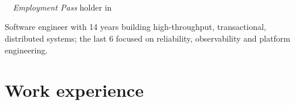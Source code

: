 \documentclass{CVSoftwareEngineer}
\begin{document}
	\section{\textbf{\cvname}}
	\begin{center}
		\href{mailto:\cvmail}{\cvmail}~\textbar~\cvlinkedin~\textbar~\cvgithub \\
		\textbf{\cvjobtitle}~\textbar~\textit{Employment Pass} holder in \cvaddress
	\end{center}
	Software engineer with 14 years building high-throughput, transactional, distributed
	systems; the last 6 focused on reliability, observability and platform engineering.

	\section{Work experience}
\end{document}
